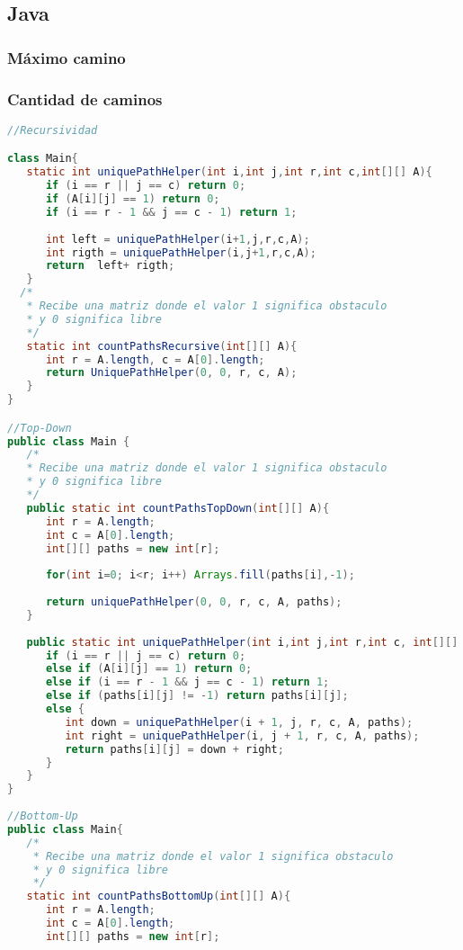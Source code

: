 \subsection{Java}
\subsubsection{Máximo camino}

\subsubsection{Cantidad de caminos}
\begin{lstlisting}[language=Java]
//Recursividad

class Main{
   static int uniquePathHelper(int i,int j,int r,int c,int[][] A){
      if (i == r || j == c) return 0;
      if (A[i][j] == 1) return 0;
      if (i == r - 1 && j == c - 1) return 1;
      
      int left = uniquePathHelper(i+1,j,r,c,A);
      int rigth = uniquePathHelper(i,j+1,r,c,A); 	
      return  left+ rigth;
   }
  /*
   * Recibe una matriz donde el valor 1 significa obstaculo
   * y 0 significa libre
   */
   static int countPathsRecursive(int[][] A){
      int r = A.length, c = A[0].length;
      return UniquePathHelper(0, 0, r, c, A);
   }
}

//Top-Down
public class Main {
   /*
   * Recibe una matriz donde el valor 1 significa obstaculo
   * y 0 significa libre
   */
   public static int countPathsTopDown(int[][] A){
      int r = A.length;
      int c = A[0].length;
      int[][] paths = new int[r];
		
      for(int i=0; i<r; i++) Arrays.fill(paths[i],-1);
      
      return uniquePathHelper(0, 0, r, c, A, paths);
   }
	
   public static int uniquePathHelper(int i,int j,int r,int c, int[][] A,int[][] paths){
      if (i == r || j == c) return 0;
      else if (A[i][j] == 1) return 0;
	  else if (i == r - 1 && j == c - 1) return 1;
      else if (paths[i][j] != -1) return paths[i][j];
      else {
         int down = uniquePathHelper(i + 1, j, r, c, A, paths);
         int right = uniquePathHelper(i, j + 1, r, c, A, paths);
         return paths[i][j] = down + right;
      }
   }
}
		
//Bottom-Up
public class Main{
   /*
    * Recibe una matriz donde el valor 1 significa obstaculo
    * y 0 significa libre
    */
   static int countPathsBottomUp(int[][] A){
      int r = A.length;
      int c = A[0].length;
      int[][] paths = new int[r];
      

\end{lstlisting}
